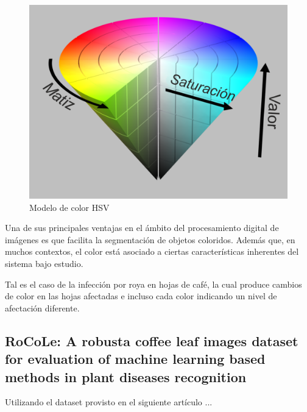 \begin{figure}[H]
\centering
\includegraphics[scale=0.8]{images/hsv_model.png}
\caption{Modelo de color HSV}
\label{img:polygon}
\end{figure}

Una de sus principales ventajas en el ámbito del procesamiento digital de imágenes es que facilita la segmentación de objetos coloridos. Además que, en muchos contextos, el color está asociado a ciertas características inherentes del sistema bajo estudio.

Tal es el caso de la infección por roya en hojas de café, la cual produce cambios de color en las hojas afectadas e incluso cada color indicando un nivel de afectación diferente.

\subsection{RoCoLe: A robusta coffee leaf images dataset for evaluation of machine learning based methods in plant diseases recognition}
Utilizando el dataset provisto en el siguiente artículo ...